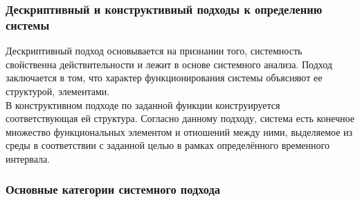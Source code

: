 \documentclass{article}
\begin{document}
\subsubsection*{Дескриптивный и конструктивный подходы к определению системы}
Дескриптивный подход основывается на признании того, системность свойственна действительности и лежит в основе системного анализа. Подход заключается в том, что характер функционирования системы объясняют ее структурой, элементами.
\\
В конструктивном подходе по заданной функции конструируется соответствующая ей структура. Согласно данному подходу, система есть конечное множество функциональных элементом и отношений между ними, выделяемое из среды в соответствии с заданной целью в рамках определённого временного интервала.
\subsubsection*{Основные категории системного подхода}
\end{document}

